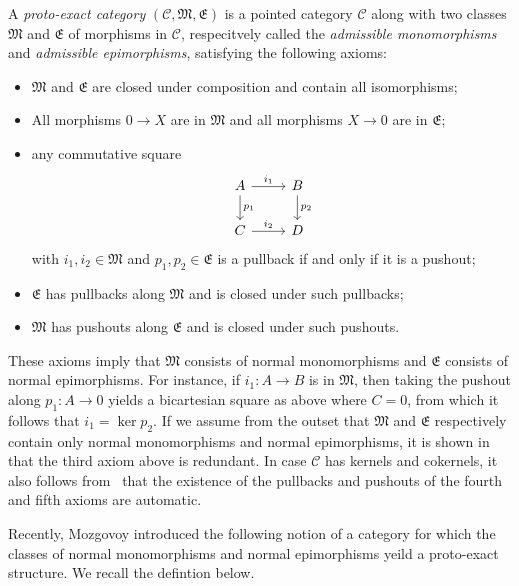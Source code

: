 \documentclass[reqno]{amsart}
\newcommand{\C}{\mathcal{C}}
\numberwithin{equation}{section}
\theoremstyle{plain}
\theoremstyle{definition}
\begin{document}
A \emph{proto-exact category} $(\C, \mathfrak{M}, \mathfrak{E})$ is a pointed category $\C$ along with two classes $\mathfrak{M}$ and $\mathfrak{E}$ of morphisms in $\C$, respecitvely called the \emph{admissible monomorphisms} and \emph{admissible epimorphisms}, satisfying the following axioms:
\begin{itemize}
    \item $\mathfrak{M}$ and $\mathfrak{E}$ are closed under composition and contain all isomorphisms;
    \item All morphisms $0 \to X$ are in $\mathfrak{M}$ and all morphisms $X \to 0$ are in $\mathfrak{E}$;
    \item any commutative square
    \[
        \begin{tikzcd}
            A \ar[r, "i_1"] \ar[d, "p_1"] & B \ar[d, "p_2"] \\
            C \ar[r, "i_2"] & D
        \end{tikzcd}
    \]
    with $i_1, i_2 \in \mathfrak{M}$ and $p_1, p_2 \in \mathfrak{E}$ is a pullback if and only if it is a pushout;
    \item $\mathfrak{E}$ has pullbacks along $\mathfrak{M}$ and is closed under such pullbacks;
    \item $\mathfrak{M}$ has pushouts along $\mathfrak{E}$ and is closed under such pushouts.
\end{itemize}
These axioms imply that $\mathfrak{M}$ consists of normal monomorphisms and $\mathfrak{E}$ consists of normal epimorphisms. For instance, if $i_1 \colon A \to B$ is in $\mathfrak{M}$, then taking the pushout along $p_1 \colon A \to 0$ yields a bicartesian square as above where $C = 0$, from which it follows that $i_1 = \ker p_2$.
If we assume from the outset that $\mathfrak{M}$ and $\mathfrak{E}$ respectively contain only normal monomorphisms and normal epimorphisms, it is shown in~\cite[Lemmas~1.2]{Mozgovoy} that the third axiom above is redundant. In case $\C$ has kernels and cokernels, it also follows from~\cite[Lemma~1.3]{Mozgovoy} that the existence of the pullbacks and pushouts of the fourth and fifth axioms are automatic. 

Recently, Mozgovoy introduced the following notion of a category for which the classes of normal monomorphisms and normal epimorphisms yeild a proto-exact structure. We recall the defintion below. 
\end{document}
